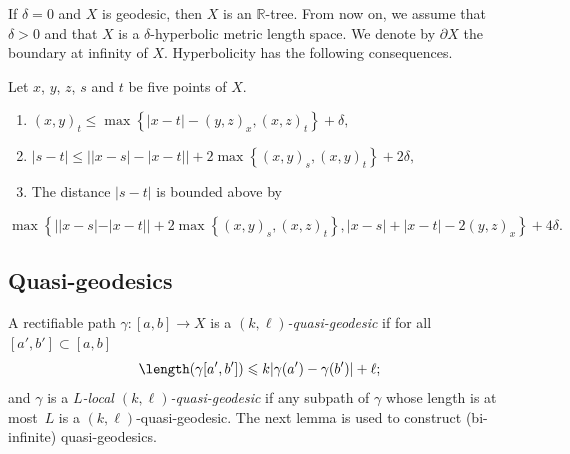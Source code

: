 If $\delta=0$ and $X$ is geodesic, then $X$ is an $\mathbb{R}$-tree.
From now on, we assume that $\delta>0$ and that $X$ is a $\delta$-hyperbolic metric length space.
We denote by $\partial X$ the boundary at infinity of $X$.
Hyperbolicity has the following consequences.
\begin{lem}
\label{res: metric inequalities}
Let $x$, $y$, $z$, $s$ and $t$ be five points of $X$.
\begin{enumerate}
\item \label{enu: metric inequalities - thin triangle}
\begin{math}
(x,y)_t \leq \max \left\{ |x - t| - (y,z)_x , (x,z)_t \right\} + \delta,
\end{math}
\item \label{enu: metric inequalities - two points close to a geodesic}
\begin{math}
|s-t| \leq \left| |x-s| - |x-t| \right| + 2\max\left\{ (x,y)_s, (x,y)_t\right\} + 2\delta,
\end{math}
\item \label{enu: metric inequalities - comparison tripod} The distance $|s-t|$ is bounded above by
\end{enumerate}
\begin{displaymath}
\max\left\{| |x-s| - |x-t|| + 2\max \left\{ (x,y)_s,(x,z)_t\right\}, |x-s| + |x-t| - 2 (y,z)_x \right\} + 4\delta.
\end{displaymath}
\end{lem}

\subsection{Quasi-geodesics}
\label{sec: quasi-geodesics}
A rectifiable path $\gamma:[a,b]\to X$ is a \emph{$(k,\ell)$-quasi-geodesic} if for all $[a',b']\subset [a,b]$
\[
\length(\gamma[a',b'])\leqslant k |\gamma(a')-\gamma(b')|+\ell;
\]
and $\gamma$ is a \emph{$L$-local $(k,\ell)$-quasi-geodesic} if any subpath of $\gamma$ whose length is at most~$L$ is a $(k,\ell)$-quasi-geodesic.
The next lemma is used to construct (bi-infinite) quasi-geodesics.

